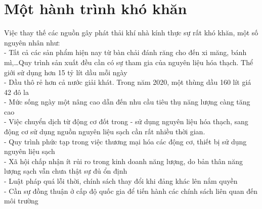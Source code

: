 \documentclass{article}
\newcommand\tab[1][1cm]{\hspace*{#1}}
\begin{document}
\section{Một hành trình khó khăn}
\tab Việc thay thế các nguồn gây phát thải khí nhà kính thực sự rất khó khăn, một số nguyên nhân như:\\
\tab\tab - Tất cả các sản phẩm hiện nay từ bàn chải đánh răng cho đến xi măng, bánh mì,\dots Quy trình sản xuất đều cần 
có sự tham gia của nguyên liệu hóa thạch. Thể giới sử dụng hơn 15 tỷ lít dầu mỗi ngày \\
\tab\tab - Dầu thô rẻ hơn cả nước giải khát. Trong năm 2020, một thùng dầu 160 lít giá 42 đô la\\
\tab\tab - Mức sống ngày một nâng cao dẫn đến nhu cầu tiêu thụ năng lượng càng tăng cao\\
\tab\tab - Việc chuyển dịch từ động cơ đốt trong - sử dụng nguyên liệu hóa thạch, sang động cơ sử dụng nguồn nguyên liệu 
sạch cần rất nhiều thời gian.\\
\tab\tab - Quy trình phức tạp trong việc thương mại hóa các động cơ, thiết bị sử dụng nguyên liệu sạch\\
\tab\tab - Xã hội chấp nhận ít rủi ro trong kinh doanh năng lượng, do bản thân năng lượng sạch vẫn chưa thật sự đủ ổn định\\
\tab\tab - Luật pháp quá lỗi thời, chính sách thay đổi khi đảng khác lên nắm quyền\\
\tab\tab - Cần sự đồng thuận ở cấp độ quốc gia để tiến hành các chính sách liên quan đến môi trường \\
\end{document}
